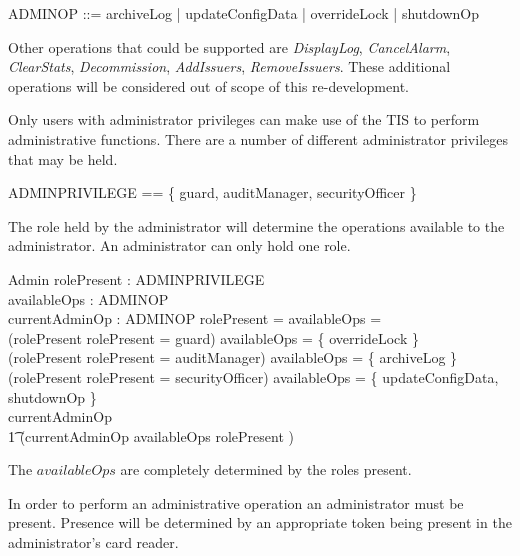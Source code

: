 \begin{syntax}
        ADMINOP ::=  archiveLog | updateConfigData |
        overrideLock | shutdownOp 
\end{syntax}

Other operations that could be supported are 
{\em DisplayLog}, 
{\em CancelAlarm}, 
{\em ClearStats}, 
{\em Decommission}, 
{\em AddIssuers}, 
{\em RemoveIssuers}.
These additional operations will be considered out of scope of this
re-development. 

Only users with administrator privileges can make use of the TIS to
perform administrative functions. There are a number of different
administrator privileges that may be held.

\begin{zed}
        ADMINPRIVILEGE == \{ guard, auditManager, securityOfficer \}
\end{zed}

The role held by the administrator will determine the operations
available to the administrator. An administrator
can only hold one role.

\begin{schema}{Admin}
        rolePresent : \Optional ADMINPRIVILEGE
\\      availableOps : \power ADMINOP
\\      currentAdminOp : \Optional ADMINOP
\where
        rolePresent = \Nil \implies availableOps = \emptyset 
\\      (rolePresent \neq \Nil \land \The rolePresent = guard) \implies availableOps = 
        \{ overrideLock \}
\\      (rolePresent \neq \Nil \land \The rolePresent = auditManager) \implies availableOps = 
        \{ archiveLog \}
\\      (rolePresent \neq \Nil \land \The rolePresent = securityOfficer) \implies availableOps = 
        \{ updateConfigData, shutdownOp \}
\\      currentAdminOp \neq \Nil \implies 
\\ \t1 (\The currentAdminOp \in availableOps \land rolePresent \neq \Nil )
\end{schema}
\begin{Zcomment}
\item
The $availableOps$ are completely determined by the roles present.
\end{Zcomment}

In order to perform an administrative operation an administrator must
be present. Presence will be determined by an appropriate token being
present in the administrator's card reader.

